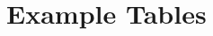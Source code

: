 \documentclass[bg=full, a4paper, 10pt, twoside, twocolumn, openany, nodeprecatedcode]{dndbook}
\begin{document}
\section{Example Tables}
\end{document}
